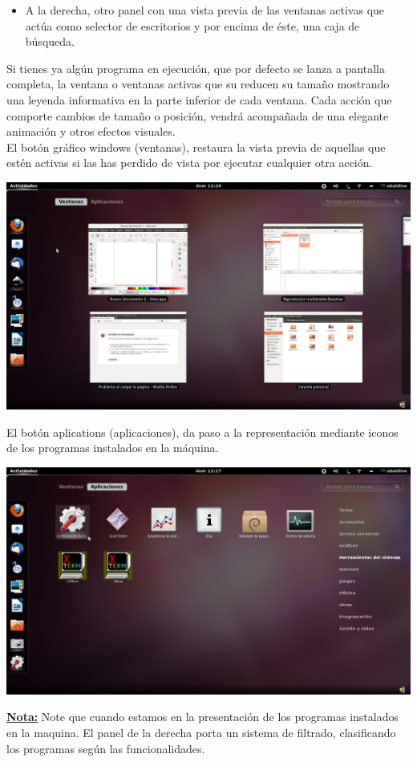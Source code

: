 \begin{itemize}
\begin{itemize}
\item A la derecha, otro panel con una vista previa de las ventanas activas que actúa como selector de escritorios y por encima de éste, una caja de búsqueda.
\end{itemize}
Si tienes ya algún programa en ejecución, que por defecto se lanza a pantalla completa, la ventana o ventanas activas que su reducen su tamaño mostrando una leyenda informativa en la parte inferior de cada ventana. Cada acción que comporte cambios de tamaño o posición, vendrá acompañada de una elegante animación y otros efectos visuales.\\
El botón gráfico windows (ventanas), restaura la vista previa de aquellas que estén activas si las has perdido de vista por ejecutar cualquier otra acción.
\begin{center}
\includegraphics[scale=0.3]{img/Pantallazo4.png} 
\end{center}
El botón aplications (aplicaciones), da paso a la representación mediante iconos de los programas instalados en la máquina.
\begin{center}
\includegraphics[scale=0.3]{img/Pantallazo5.png}
\end{center}
\underline{\bf Nota:} Note que cuando estamos en la presentación de los programas instalados en la maquina. El panel de la derecha porta un sistema de filtrado, clasificando los programas según las funcionalidades.\\


\end{itemize}
